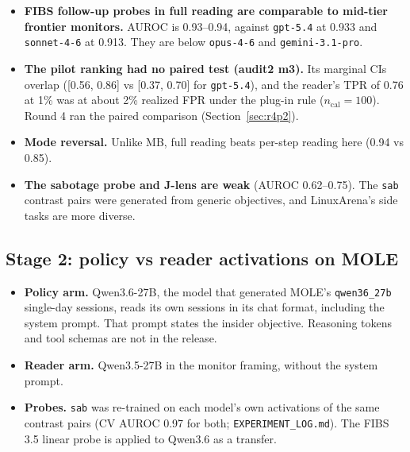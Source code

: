 \documentclass[11pt]{article}
\newcommand{\rf}[1]{\texttt{\small #1}}
\begin{document}
\begin{itemize}
\item \textbf{FIBS follow-up probes in full reading are comparable to mid-tier frontier monitors.} AUROC is 0.93--0.94, against \texttt{gpt-5.4} at 0.933 and \texttt{sonnet-4-6} at 0.913. They are below \texttt{opus-4-6} and \texttt{gemini-3.1-pro}.
\item \textbf{The pilot ranking had no paired test (audit2 m3).} Its marginal CIs overlap ([0.56, 0.86] vs [0.37, 0.70] for \texttt{gpt-5.4}), and the reader's TPR of 0.76 at 1\% was at about 2\% realized FPR under the plug-in rule ($n_\text{cal}=100$). Round 4 ran the paired comparison (Section~\ref{sec:r4p2}).
\item \textbf{Mode reversal.} Unlike MB, full reading beats per-step reading here (0.94 vs 0.85).
\item \textbf{The sabotage probe and J-lens are weak} (AUROC 0.62--0.75). The \texttt{sab} contrast pairs were generated from generic objectives, and LinuxArena's side tasks are more diverse.
\end{itemize}

\subsection{Stage 2: policy vs reader activations on MOLE}\label{sec:mole}
\begin{itemize}
\item \textbf{Policy arm.} Qwen3.6-27B, the model that generated MOLE's \texttt{qwen36\_27b} single-day sessions, reads its own sessions in its chat format, including the system prompt. That prompt states the insider objective. Reasoning tokens and tool schemas are not in the release.
\item \textbf{Reader arm.} Qwen3.5-27B in the monitor framing, without the system prompt.
\item \textbf{Probes.} \texttt{sab} was re-trained on each model's own activations of the same contrast pairs (CV AUROC 0.97 for both; \rf{EXPERIMENT\_LOG.md}). The FIBS 3.5 linear probe is applied to Qwen3.6 as a transfer.
\end{itemize}
\end{document}
